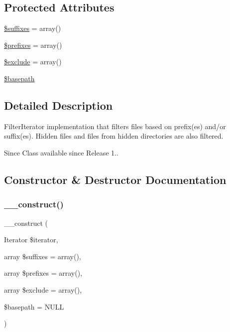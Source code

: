 \subsection*{Protected Attributes}
\begin{DoxyCompactItemize}
\item 
\mbox{\hyperlink{class_file___iterator_ab2b9f96bf57b5bbe59371e5917e40021}{\$suffixes}} = array()
\item 
\mbox{\hyperlink{class_file___iterator_a8dd2685d77e3731afd50eaa21c4f2055}{\$prefixes}} = array()
\item 
\mbox{\hyperlink{class_file___iterator_aa9e9e35cde2e009dabb6a066e3202c5c}{\$exclude}} = array()
\item 
\mbox{\hyperlink{class_file___iterator_aee22d3e80d6c5b8fd389a129b9f468e3}{\$basepath}}
\end{DoxyCompactItemize}


\subsection{Detailed Description}
Filter\+Iterator implementation that filters files based on prefix(es) and/or suffix(es). Hidden files and files from hidden directories are also filtered.

\begin{DoxySince}{Since}
Class available since Release 1.. 
\end{DoxySince}


\subsection{Constructor \& Destructor Documentation}
\mbox{\label{class_file___iterator_a2b2c79c136d4bf89ff9386ea9c00bb79}} 
\subsubsection{\texorpdfstring{\+\_\+\+\_\+construct()}{\_\_construct()}}
{\footnotesize\ttfamily \+\_\+\+\_\+construct (\begin{DoxyParamCaption}\item[{Iterator}]{\$iterator,  }\item[{array}]{\$suffixes = {\ttfamily array()},  }\item[{array}]{\$prefixes = {\ttfamily array()},  }\item[{array}]{\$exclude = {\ttfamily array()},  }\item[{}]{\$basepath = {\ttfamily NULL} }\end{DoxyParamCaption})}


